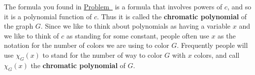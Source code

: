 \documentclass[10pt,]{book}
\newcommand{\terminology}[1]{\textbf{#1}}
\theoremstyle{plain}
\theoremstyle{definition}
\numberwithin{equation}{chapter}
\begin{document}
The formula you found in \hyperref[chromaticpoly]{Problem~} is a formula that involves powers of \(c\), and so it is a polynomial function of \(c\). Thus it is called the \terminology{chromatic polynomial} of the graph \(G\). Since we like to think about polynomials as having a variable \(x\) and we like to think of \(c\) as standing for some constant, people often use \(x\) as the notation for the number of colors we are using to color \(G\). Frequently people will use \(\chi_G(x)\) to stand for the number of way to color \(G\) with \(x\) colors, and call \(\chi_G(x)\) the \terminology{chromatic polynomial} of \(G\).%
\typeout{************************************************}
\typeout{************************************************}
\end{document}
